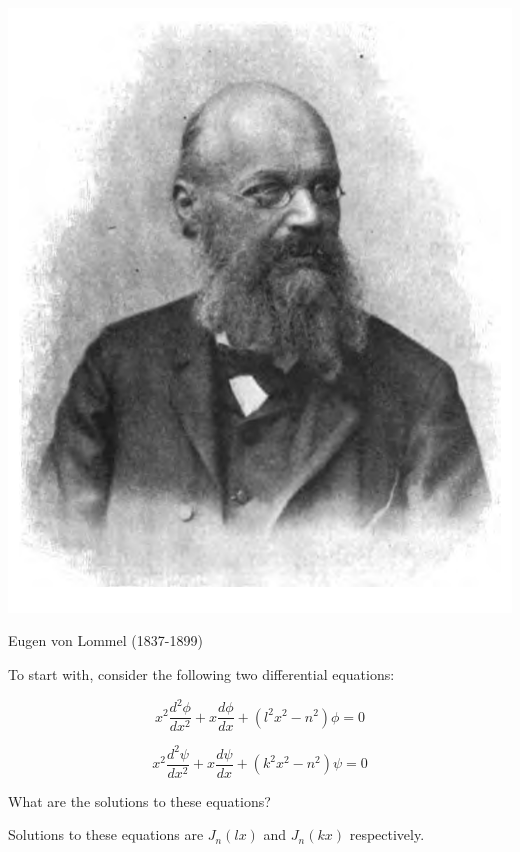 \begin{marginfigure}[-.0cm]
  \includegraphics{bessel/figures/e_lommel}
  \caption{Eugen von Lommel (1837-1899)}
\end{marginfigure}

To start with, consider the following two differential equations:

\begin{equation}
x^2 \frac{d^2 \phi}{dx^2}  + x \frac{d \phi}{dx} + \left(l^2x^2 - n^2\right) \phi = 0 \label{eq-bessel-orth-1}
\end{equation} 

\begin{equation}
x^2 \frac{d^2 \psi}{dx^2}  + x \frac{d \psi}{dx} + \left(k^2x^2 - n^2\right) \psi = 0 \label{eq-bessel-orth-2}
\end{equation}

\begin{cue}
What are the solutions to these equations?  
\end{cue}

Solutions to these equations are $J_n(lx)$ and $J_n(kx)$ respectively.

